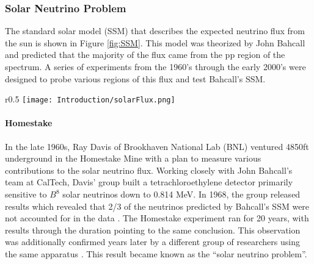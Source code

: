 \subsubsection{Solar Neutrino Problem} 
The standard solar model (SSM) that describes the expected neutrino flux from the sun is shown in Figure \ref{fig:SSM}.  This model was theorized by John Bahcall and predicted that the majority of the flux came from the pp region of the spectrum.  A series of experiments from the 1960's through the early 2000's were designed to probe various regions of this flux and test Bahcall's SSM.  

\begin{wrapfigure}{r}{0.5\textwidth}
\texttt{[image: Introduction/solarFlux.png]}
\caption{John Bahcall's Standard Solar Flux Model}
\label{fig:SSM}
\end{wrapfigure}

\paragraph{Homestake} In the late 1960s, Ray Davis of Brookhaven National Lab (BNL) ventured 4850ft underground in the Homestake Mine with a plan to measure various contributions to the solar neutrino flux. Working closely with John Bahcall's team at CalTech, Davis' group built a tetrachloroethylene detector primarily sensitive to $B^8$ solar neutrinos down to 0.814 MeV. In 1968, the group released results which revealed that 2/3 of the neutrinos predicted by Bahcall's SSM were not accounted for in the data \cite{bib:ray0}. The Homestake experiment ran for 20 years, with results through the duration pointing to the same conclusion. This observation was additionally confirmed years later by a different group of researchers using the same apparatus \cite{bib:rayreview}.  This result became known as the ``solar neutrino problem''.




